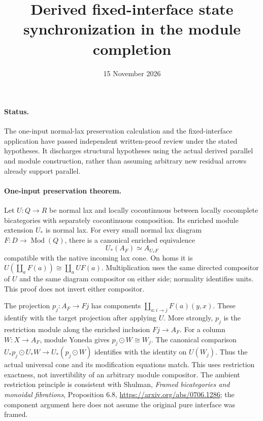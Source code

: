 \documentclass{article}
\title{Derived fixed-interface state synchronization in the module completion}
\date{15 November 2026}
\begin{document}
\maketitle
\paragraph{Status.} The one-input normal-lax preservation calculation and the fixed-interface application have passed independent written-proof review under the stated hypotheses. It discharges structural hypotheses using the actual derived parallel and module construction, rather than assuming arbitrary new residual arrows already support parallel.

\paragraph{One-input preservation theorem.} Let $U:Q\to R$ be normal lax and locally cocontinuous between locally cocomplete bicategories with separately cocontinuous composition. Its enriched module extension $U_*$ is normal lax. For every small normal lax diagram $F:D\to\operatorname{Mod}(Q)$, there is a canonical enriched equivalence
\[
 U_*(A_F)\simeq A_{U_*F}
\]
compatible with the native incoming lax cone. On homs it is $U(\coprod_aF(a))\cong\coprod_a UF(a)$. Multiplication uses the same directed compositor of $U$ and the same diagram compositor on either side; normality identifies units. This proof does not invert either compositor.

The projection $p_j:A_F\to Fj$ has components $\coprod_{a:i\to j}F(a)(y,x)$. These identify with the target projection after applying $U$. More strongly, $p_j$ is the restriction module along the enriched inclusion $Fj\to A_F$. For a column $W:X\to A_F$, module Yoneda gives $p_j\odot W\cong W_j$. The canonical comparison $U_*p_j\odot U_*W\to U_*(p_j\odot W)$ identifies with the identity on $U(W_j)$. Thus the actual universal cone and its modification equations match. This uses restriction exactness, not invertibility of an arbitrary module compositor. The ambient restriction principle is consistent with Shulman, \emph{Framed bicategories and monoidal fibrations}, Proposition 6.8, \url{https://arxiv.org/abs/0706.1286}; the component argument here does not assume the original pure interface was framed.
\end{document}
